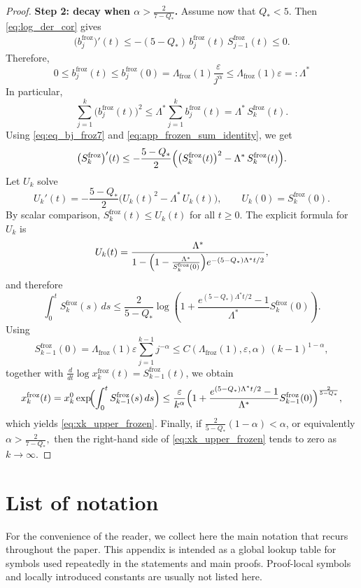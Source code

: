 \documentclass[reqno,11pt]{amsart}
\begin{document}
\begin{proof}
\medskip
\noindent\textbf{Step 2: decay when $\alpha>\frac{2}{7-Q_*}$.}
Assume now that $Q_*<5$. Then
\eqref{eq:log_der_cor} gives
\begin{align}
\label{eq:eq_bj_froz7}
\bigl(b_j^{\mathrm{froz}}\bigr)'(t)
\le
-(5-Q_*)\,b_j^{\mathrm{froz}}(t)\,S_{j-1}^{\mathrm{froz}}(t)
\le 0.
\end{align}
Therefore,
\[
0\le b_j^{\mathrm{froz}}(t)\le b_j^{\mathrm{froz}}(0)
=
\Lambda_{\mathrm{froz}}(1)\frac{\varepsilon}{j^\alpha}
\le \Lambda_{\mathrm{froz}}(1)\varepsilon=: \Lambda^*
\]
In particular,
\[
\sum_{j=1}^k \bigl(b_j^{\mathrm{froz}}(t)\bigr)^2
\le
\Lambda^*\sum_{j=1}^k b_j^{\mathrm{froz}}(t)
=
\Lambda^*\, S_k^{\mathrm{froz}}(t).
\]
Using \eqref{eq:eq_bj_froz7} and \eqref{eq:app_frozen_sum_identity}, we get
\[
\bigl(S_k^{\mathrm{froz}}\bigr)'(t)
\le
-\frac{5-Q_*}{2}
\Bigl(
\bigl(S_k^{\mathrm{froz}}(t)\bigr)^2-\Lambda^*\, S_k^{\mathrm{froz}}(t)
\Bigr).
\]
Let $U_k$ solve
\[
U_k'(t)
=
-\frac{5-Q_*}{2}\bigl(U_k(t)^2-\Lambda^*\, U_k(t)\bigr),
\qquad
U_k(0)=S_k^{\mathrm{froz}}(0).
\]
By scalar comparison, $S_k^{\mathrm{froz}}(t)\le U_k(t)$ for all $t\ge0.$
The explicit formula for $U_k$ is
\[
U_k(t)
=
\frac{\Lambda^*}{1-\Bigl(1-\frac{\Lambda^*}{S_k^{\mathrm{froz}}(0)}\Bigr)e^{-(5-Q_*)\Lambda^*t/2}},
\]
and therefore
\[
\int_0^t S_k^{\mathrm{froz}}(s)\,ds
\le
\frac{2}{5-Q_*}
\log\!\left(1+
\frac{e^{(5-Q_*)\Lambda^*t/2}-1}{\Lambda^*}
S_k^{\mathrm{froz}}(0)\right).
\]
Using
\[
S_{k-1}^{\mathrm{froz}}(0)
=
\Lambda_{\mathrm{froz}}(1)\varepsilon\sum_{j=1}^{k-1} j^{-\alpha}
\leq C(\Lambda_{\mathrm{froz}}(1),\varepsilon,\alpha)
\, 
(k-1)^{1-\alpha},
\]
together with $\frac{d}{dt}\log x_k^{\mathrm{froz}}(t)=S_{k-1}^{\mathrm{froz}}(t)$, we obtain
\[
x_k^{\mathrm{froz}}(t)
=
x_k^0\exp\!\Bigl(\int_0^t S_{k-1}^{\mathrm{froz}}(s)\,ds\Bigr)
\le
\frac{\varepsilon}{k^\alpha}
\Bigl(1+ \frac{e^{(5-Q_*)\Lambda^*t/2}-1}{\Lambda^*}
S_{k-1}^{\mathrm{froz}}(0)\Bigr)^{\frac{2}{5-Q_*}},
\]
which yields \eqref{eq:xk_upper_frozen}. Finally,
if $
\frac{2}{5-Q_*}(1-\alpha)<\alpha
$, or equivalently $
\alpha>\frac{2}{7-Q_*},$
then the right-hand side of \eqref{eq:xk_upper_frozen} tends to zero as
$k\to\infty$.
\end{proof}



\section{List of notation}
\label{sec:notation}

For the convenience of the reader, we collect here the main notation that recurs throughout the paper. This appendix is intended as a global lookup table for symbols used repeatedly in the statements and main proofs. Proof-local symbols and locally introduced constants are usually not listed here.
\end{document}
